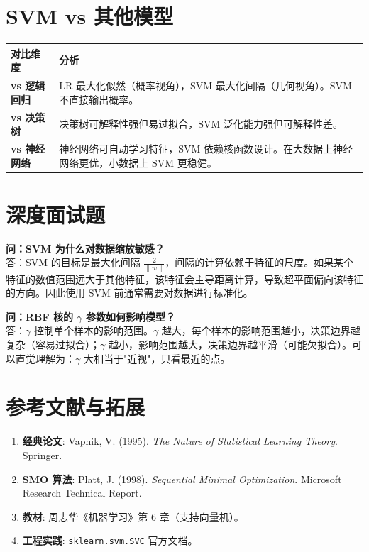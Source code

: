 \documentclass[12pt, a4paper]{book}
\begin{document}
\section{SVM vs 其他模型}
\begin{table}[h]
\centering
\begin{tabularx}{\textwidth}{|l|X|}
\hline
\textbf{对比维度} & \textbf{分析} \\
\hline
\textbf{vs 逻辑回归} & LR 最大化似然（概率视角），SVM 最大化间隔（几何视角）。SVM 不直接输出概率。 \\
\hline
\textbf{vs 决策树} & 决策树可解释性强但易过拟合，SVM 泛化能力强但可解释性差。 \\
\hline
\textbf{vs 神经网络} & 神经网络可自动学习特征，SVM 依赖核函数设计。在大数据上神经网络更优，小数据上 SVM 更稳健。 \\
\hline
\end{tabularx}
\end{table}

\section{深度面试题}

\textbf{问：SVM 为什么对数据缩放敏感？}\\
答：SVM 的目标是最大化间隔 $\frac{2}{\|w\|}$，间隔的计算依赖于特征的尺度。如果某个特征的数值范围远大于其他特征，该特征会主导距离计算，导致超平面偏向该特征的方向。因此使用 SVM 前通常需要对数据进行标准化。

\textbf{问：RBF 核的 $\gamma$ 参数如何影响模型？}\\
答：$\gamma$ 控制单个样本的影响范围。$\gamma$ 越大，每个样本的影响范围越小，决策边界越复杂（容易过拟合）；$\gamma$ 越小，影响范围越大，决策边界越平滑（可能欠拟合）。可以直觉理解为：$\gamma$ 大相当于"近视"，只看最近的点。

\section{参考文献与拓展}
\begin{enumerate}
    \item \textbf{经典论文}: Vapnik, V. (1995). \textit{The Nature of Statistical Learning Theory}. Springer.
    \item \textbf{SMO 算法}: Platt, J. (1998). \textit{Sequential Minimal Optimization}. Microsoft Research Technical Report.
    \item \textbf{教材}: 周志华《机器学习》第 6 章（支持向量机）。
    \item \textbf{工程实践}: \texttt{sklearn.svm.SVC} 官方文档。
\end{enumerate}
\end{document}
